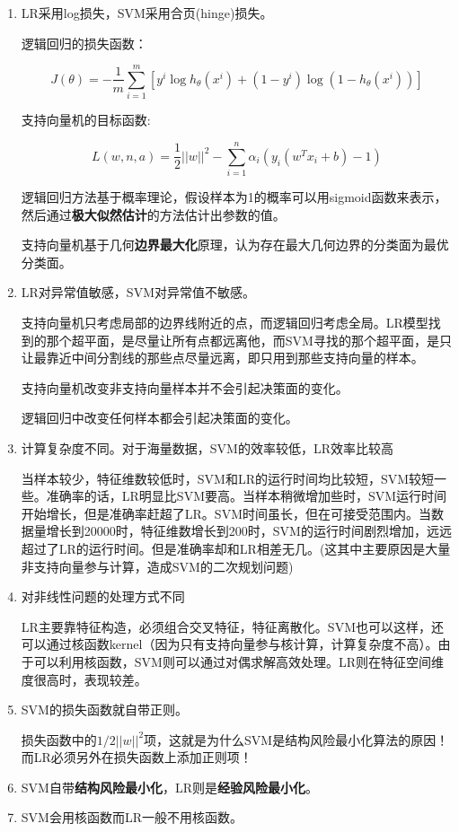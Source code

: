 \begin{enumerate}\itemsep0em
		\item LR采用log损失，SVM采用合页(hinge)损失。

			逻辑回归的损失函数：

		$$
		J(\theta)=-\frac{1}{m}\sum^m_{i=1}\left[y^{i}\log h_{\theta}(x^{i})+ (1-y^{i})\log(1-h_{\theta}(x^{i}))\right]
		$$

		支持向量机的目标函数:

		$$
		L(w,n,a)=\frac{1}{2}||w||^2-\sum^n_{i=1}\alpha_i \left( y_i(w^Tx_i+b)-1\right)
		$$

		逻辑回归方法基于概率理论，假设样本为1的概率可以用sigmoid函数来表示，然后通过{\bf 极大似然估计}的方法估计出参数的值。

		支持向量机基于几何{\bf 边界最大化}原理，认为存在最大几何边界的分类面为最优分类面。

	\item LR对异常值敏感，SVM对异常值不敏感。

		支持向量机只考虑局部的边界线附近的点，而逻辑回归考虑全局。LR模型找到的那个超平面，是尽量让所有点都远离他，而SVM寻找的那个超平面，是只让最靠近中间分割线的那些点尽量远离，即只用到那些支持向量的样本。

		支持向量机改变非支持向量样本并不会引起决策面的变化。

		逻辑回归中改变任何样本都会引起决策面的变化。

	\item 计算复杂度不同。对于海量数据，SVM的效率较低，LR效率比较高

		当样本较少，特征维数较低时，SVM和LR的运行时间均比较短，SVM较短一些。准确率的话，LR明显比SVM要高。当样本稍微增加些时，SVM运行时间开始增长，但是准确率赶超了LR。SVM时间虽长，但在可接受范围内。当数据量增长到20000时，特征维数增长到200时，SVM的运行时间剧烈增加，远远超过了LR的运行时间。但是准确率却和LR相差无几。(这其中主要原因是大量非支持向量参与计算，造成SVM的二次规划问题)

	\item 对非线性问题的处理方式不同

		LR主要靠特征构造，必须组合交叉特征，特征离散化。SVM也可以这样，还可以通过核函数kernel（因为只有支持向量参与核计算，计算复杂度不高）。由于可以利用核函数，SVM则可以通过对偶求解高效处理。LR则在特征空间维度很高时，表现较差。

	\item SVM的损失函数就自带正则。

		损失函数中的$1/2||w||^2$项，这就是为什么SVM是结构风险最小化算法的原因！而LR必须另外在损失函数上添加正则项！

	\item SVM自带{\bf 结构风险最小化}，LR则是{\bf 经验风险最小化}。

	\item SVM会用核函数而LR一般不用核函数。

\end{enumerate}

